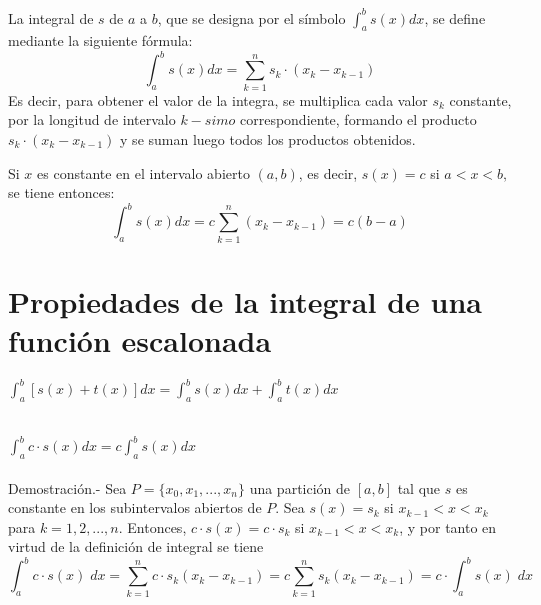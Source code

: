     \begin{tcolorbox}
	\begin{def.}
	    La integral de $s$ de $a$ a $b$, que se designa por el símbolo $\int_{a}^{b} s(x) dx$, se define mediante la siguiente fórmula: $$\int_{a}^{b} s(x) dx = \sum\limits_{k=1}^{n} s_k \cdot (x_k - x_{k-1})$$
	    Es decir, para obtener el valor de la integra, se multiplica cada valor $s_k$ constante, por la longitud de intervalo $k-simo$ correspondiente, formando el producto $s_k\cdot (x_k - x_{k-1})$ y se suman luego todos los productos obtenidos.
	\end{def.}
    \end{tcolorbox}

    \begin{tcolorbox}
	\begin{def.}
	    Si $x$ es constante en el intervalo abierto $(a,b)$, es decir, $s(x)=c$ si $a<x<b,$ se tiene entonces: $$\int_{a}^{b} s(x) dx = c \sum\limits_{k=1}^{n} (x_k - x_{k-1}) = c(b-a)$$
	\end{def.}
    \end{tcolorbox}

\section{Propiedades de la integral de una función escalonada}

    \begin{teo}
	$\displaystyle\int_{a}^{b} [s(x) + t(x)] dx = \int_{a}^{b} s(x) dx + \int_{a}^{b} t(x) dx$\\\\
    \end{teo}

    \begin{teo}
	$\displaystyle\int_{a}^{b} c \cdot s(x) dx = c\int_{a}^{b} s(x) dx$\\\\
	    Demostración.-\; Sea $P=\lbrace x_0,x_1,...,x_n \rbrace$ una partición de $[a,b]$ tal que $s$ es constante en los subintervalos abiertos de $P$. Sea $s(x)=s_k$ si $x_{k-1}<x<x_k$ para $k=1,2,...,n$. Entonces, $c \cdot s(x) = c \cdot s_k$ si $x_{k-1}<x<x_k$, y por tanto en virtud de la definición de integral se tiene $$\displaystyle\int_{a}^{b} c\cdot s(x) \; dx = \sum\limits_{k=1}^n c \cdot s_k (x_k - x_{k-1}) = c \sum\limits_{k=1}^n s_k(x_k - x_{k-1}) = c\cdot \int_{a}^{b} s(x) \; dx$$\\
    \end{teo}

